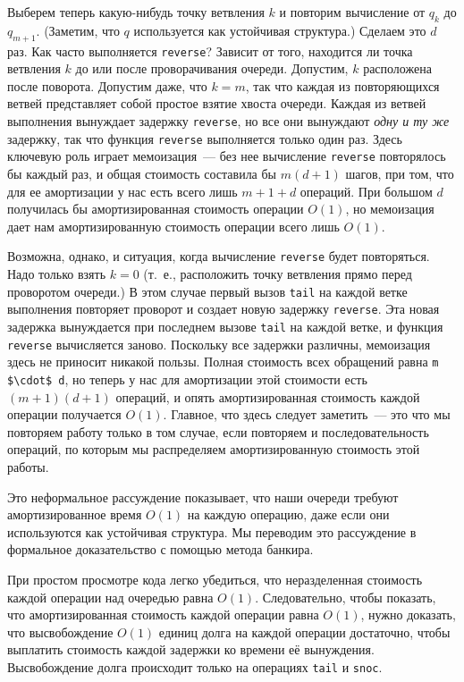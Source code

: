 Выберем теперь какую-нибудь точку ветвления $k$ и повторим вычисление
от $q_k$ до $q_{m+1}$. (Заметим, что $q$ используется как устойчивая
структура.) Сделаем это $d$ раз. Как часто выполняется
\lstinline!reverse!? Зависит от того, находится ли точка ветвления $k$
до или после проворачивания очереди. Допустим, $k$ расположена после
поворота. Допустим даже, что $k = m$, так что каждая из повторяющихся
ветвей представляет собой простое взятие хвоста очереди. Каждая из
ветвей выполнения вынуждает задержку \lstinline!reverse!, но все они
вынуждают \emph{одну и ту же} задержку, так что функция
\lstinline!reverse! выполняется только один раз. Здесь ключевую роль
играет мемоизация~--- без нее вычисление \lstinline!reverse!
повторялось бы каждый раз, и общая стоимость составила бы $m(d+1)$
шагов, при том, что для ее амортизации у нас есть всего лишь $m + 1 +
d$ операций. При большом $d$ получилась бы амортизированная стоимость
операции $O(1)$, но мемоизация дает нам амортизированную стоимость
операции всего лишь $O(1)$.

Возможна, однако, и ситуация, когда вычисление \lstinline!reverse!
будет повторяться. Надо только взять $k = 0$ (т.~е., расположить точку
ветвления прямо перед проворотом очереди.) В этом случае первый вызов
\lstinline!tail! на каждой ветке выполнения повторяет проворот и
создает новую задержку \lstinline!reverse!. Эта новая задержка
вынуждается при последнем вызове \lstinline!tail! на каждой ветке, и
функция \lstinline!reverse! вычисляется заново. Поскольку все задержки
различны, мемоизация здесь не приносит никакой пользы. Полная
стоимость всех обращений равна \lstinline!m $\cdot$ d!, но теперь у нас
для амортизации этой стоимости есть $(m + 1)(d + 1)$ операций, и опять
амортизированная стоимость каждой операции получается $O(1)$. Главное,
что здесь следует заметить~--- это
 что мы повторяем работу только в том
случае, если повторяем и последовательность операций, по которым мы
распределяем амортизированную стоимость этой работы.

Это неформальное рассуждение показывает, что наши очереди требуют
амортизированное время $O(1)$ на каждую операцию, даже если они
используются как устойчивая структура. Мы переводим это рассуждение в
формальное доказательство с помощью метода банкира.

При простом просмотре кода легко убедиться, что неразделенная
стоимость каждой операции над очередью равна $O(1)$. Следовательно,
чтобы показать, что амортизированная стоимость каждой операции равна
$O(1)$, нужно доказать, что высвобождение $O(1)$ единиц долга на
каждой операции достаточно, чтобы выплатить стоимость каждой задержки
ко времени её вынуждения. Высвобождение долга происходит только на
операциях \lstinline!tail! и \lstinline!snoc!.

